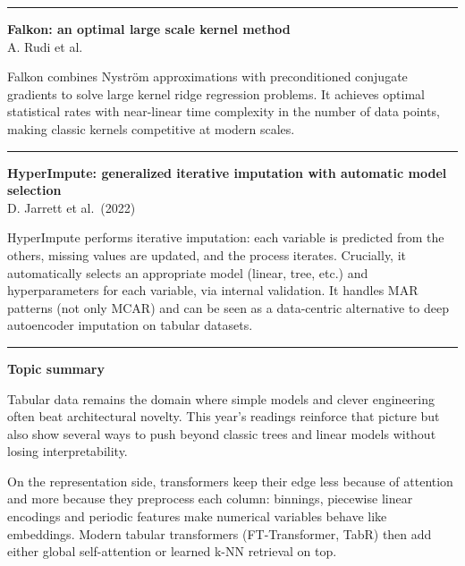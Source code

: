 \documentclass[a5paper]{article}
\def\subsection#1{{\par\bigskip\goodbreak\large\bfseries #1\par}}
\begin{document}
\begin{center}\rule{0.5\linewidth}{0.5pt}\end{center}

\textbf{Falkon: an optimal large scale kernel method}\\
A. Rudi et al.

Falkon combines Nyström approximations with preconditioned conjugate
gradients to solve large kernel ridge regression problems. It achieves
optimal statistical rates with near-linear time complexity in the number
of data points, making classic kernels competitive at modern scales.

\begin{center}\rule{0.5\linewidth}{0.5pt}\end{center}

\textbf{HyperImpute: generalized iterative imputation with automatic
model selection}\\
D. Jarrett et al.~(2022)

HyperImpute performs iterative imputation: each variable is predicted
from the others, missing values are updated, and the process iterates.
Crucially, it automatically selects an appropriate model (linear, tree,
etc.) and hyperparameters for each variable, via internal validation. It
handles MAR patterns (not only MCAR) and can be seen as a data-centric
alternative to deep autoencoder imputation on tabular datasets.

\begin{center}\rule{0.5\linewidth}{0.5pt}\end{center}

\subsection{Topic summary}\label{topic-summary-2}

Tabular data remains the domain where simple models and clever
engineering often beat architectural novelty. This year's readings
reinforce that picture but also show several ways to push beyond classic
trees and linear models without losing interpretability.

On the representation side, transformers keep their edge less because of
attention and more because they preprocess each column: binnings,
piecewise linear encodings and periodic features make numerical
variables behave like embeddings. Modern tabular transformers
(FT-Transformer, TabR) then add either global self-attention or learned
k-NN retrieval on top.
\end{document}
